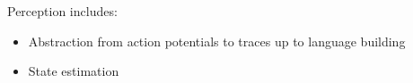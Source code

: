\begin{frame}[allowframebreaks]{Perception}
    includes:
    \begin{itemize}
        \item Abstraction from action potentials to traces up to language building
        \item State estimation
    \end{itemize}
\end{frame}